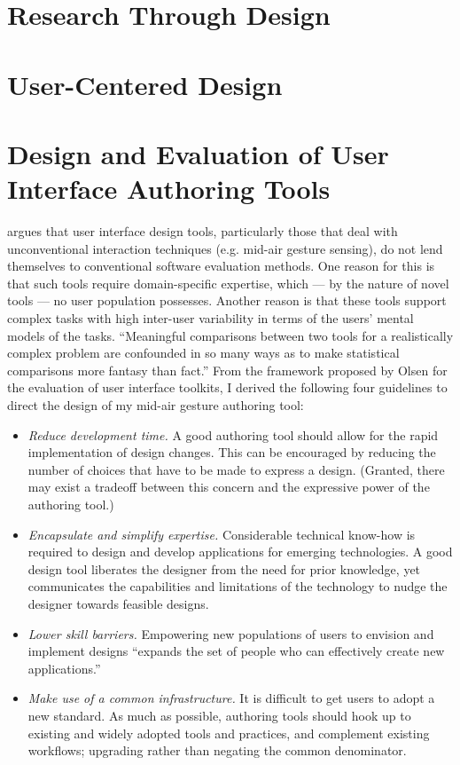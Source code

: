 \section{Research Through Design}

\section{User-Centered Design}
\label{sec:user-centered-design}

\section{Design and Evaluation of User Interface Authoring Tools}

\textcite{Olsen:2007} argues that user interface design tools, particularly those that deal with unconventional interaction techniques (e.g. mid-air gesture sensing), do not lend themselves to conventional software evaluation methods. One reason for this is that such tools require domain-specific expertise, which --- by the nature of novel tools --- no user population possesses. Another reason is that these tools support complex tasks with high inter-user variability in terms of the users’ mental models of the tasks. “Meaningful comparisons between two tools for a realistically complex problem are confounded in so many ways as to make statistical comparisons more fantasy than fact.” \parencite{Olsen:2007} From the framework proposed by Olsen for the evaluation of user interface toolkits, I derived the following four guidelines to direct the design of my mid-air gesture authoring tool:

\begin{itemize}
\item \emph{Reduce development time.} A good authoring tool should allow for the rapid implementation of design changes. This can be encouraged by reducing the number of choices that have to be made to express a design. (Granted, there may exist a tradeoff between this concern and the expressive power of the authoring tool.)
\item \emph{Encapsulate and simplify expertise.} Considerable technical know-how is required to design and develop applications for emerging technologies. A good design tool liberates the designer from the need for prior knowledge, yet communicates the capabilities and limitations of the technology to nudge the designer towards feasible designs.
\item \emph{Lower skill barriers.} Empowering new populations of users to envision and implement designs “expands the set of people who can effectively create new applications.” \parencite{Olsen:2007}
\item \emph{Make use of a common infrastructure.} It is difficult to get users to adopt a new standard. As much as possible, authoring tools should hook up to existing and widely adopted tools and practices, and complement existing workflows; upgrading rather than negating the common denominator.
\end{itemize}

